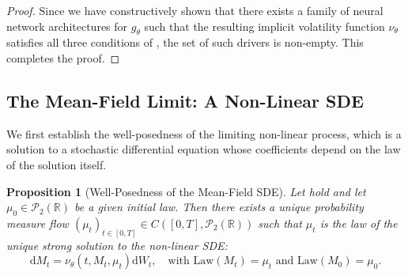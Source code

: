 \documentclass[qian]{imsart}
\newcommand{\R}{\mathbb{R}}
\newcommand{\Pcal}{\mathcal{P}}
\newcommand{\dd}{\mathrm{d}}
\theoremstyle{plain}
\newtheorem{proposition}[theorem]{Proposition}
\theoremstyle{definition}
\begin{document}
\begin{proof}
Since we have constructively shown that there exists a family of neural network architectures for $g_\theta$ such that the resulting implicit volatility function $\nu_\theta$ satisfies all three conditions of , the set of such drivers is non-empty. This completes the proof.
\end{proof}

\subsection{The Mean-Field Limit: A Non-Linear SDE}

We first establish the well-posedness of the limiting non-linear process, which is a solution to a stochastic differential equation whose coefficients depend on the law of the solution itself.

\begin{proposition}[Well-Posedness of the Mean-Field SDE]
\label{prop:mckean_sde_wellposedness}
Let  hold and let $\mu_0 \in \Pcal_2(\R)$ be a given initial law. Then there exists a unique probability measure flow $(\mu_t)_{t \in [0,T]} \in C([0,T], \Pcal_2(\R))$ such that $\mu_t$ is the law of the unique strong solution to the non-linear SDE:
\begin{equation} \label{eq:nlsde_revised}
    \dd M_t = \nu_\theta(t, M_t, \mu_t)\dd W_t, \quad \text{with } \mathrm{Law}(M_t) = \mu_t \text{ and } \mathrm{Law}(M_0) = \mu_0.
\end{equation}
\end{proposition}
\end{document}
